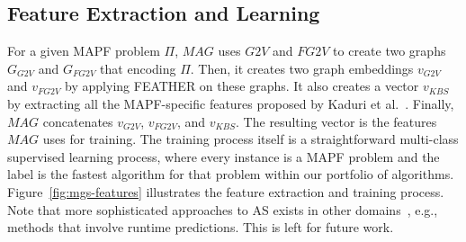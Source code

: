 \documentclass{ecai}
\newcommand{\Omri}[1]{}
\newcommand{\Carmel}[1]{}
\newcommand{\gtv}[1]{\ensuremath{\textit{G2V}}\xspace}
\newcommand{\fgtv}[1]{\ensuremath{\textit{FG2V}}\xspace}
\newcommand{\kaduri}[1]{\ensuremath{\textit{KBS}}\xspace}
\newcommand{\mapfgas}[1]{\ensuremath{\textit{MAG}}\xspace}
\begin{document}
\subsection{Feature Extraction and Learning}


For a given MAPF problem $\Pi$, \mapfgas\ uses \gtv\ and \fgtv\ to create two graphs $G_\gtv\ $ and $G_\fgtv\ $ that encoding $\Pi$. 
Then, it creates two graph embeddings $v_\gtv\ $ and $v_\fgtv\ $ by applying FEATHER on these graphs. 
It also creates a vector $v_\kaduri\ $ by extracting all the MAPF-specific features proposed by Kaduri et al.~\cite{kaduri2020algorithm}. 
Finally, \mapfgas\ concatenates 
$v_\gtv\ $, $v_\fgtv\ $, and $v_\kaduri\ $. 
The resulting vector is the features \mapfgas\ uses for training. 
The training process itself is a straightforward multi-class supervised learning process, 
where every instance is a MAPF problem and the label is the fastest algorithm for that problem within our portfolio of algorithms. 
Figure~\ref{fig:mgs-features} illustrates the feature extraction and training process. 
Note that more sophisticated approaches to AS exists in other domains~\cite{kerschke2019automated}, e.g., methods that involve runtime predictions. This is left for future work.  
\end{document}
